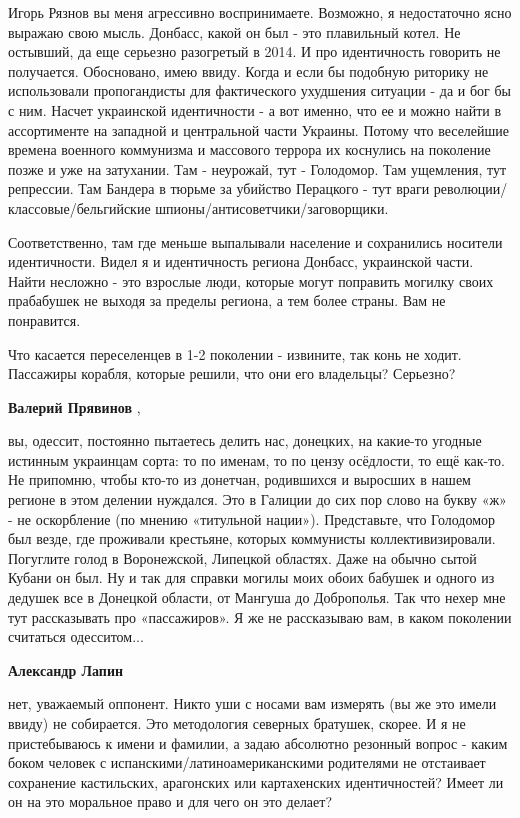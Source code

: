 \begin{itemize}
\begin{itemize}

Игорь Рязнов вы меня агрессивно воспринимаете. Возможно, я недостаточно ясно
выражаю свою мысль. Донбасс, какой он был - это плавильный котел. Не остывший,
да еще серьезно разогретый в 2014. И про идентичность говорить не получается.
Обосновано, имею ввиду. Когда и если бы подобную риторику не использовали
пропогандисты для фактического ухудшения ситуации - да и бог бы с ним. Насчет
украинской идентичности - а вот именно, что ее и можно найти в ассортименте на
западной и центральной части Украины. Потому что веселейшие времена военного
коммунизма и массового террора их коснулись на поколение позже и уже на
затухании. Там - неурожай, тут - Голодомор. Там ущемления, тут репрессии. Там
Бандера в тюрьме за убийство Перацкого - тут враги
революции/классовые/бельгийские шпионы/антисоветчики/заговорщики.

Соответственно, там где меньше выпалывали население и сохранились носители
идентичности. Видел я и идентичность региона Донбасс, украинской части. Найти
несложно - это взрослые люди, которые могут поправить могилку своих прабабушек
не выходя за пределы региона, а тем более страны. Вам не понравится.

Что касается переселенцев в 1-2 поколении - извините, так конь не ходит. Пассажиры корабля, которые решили, что они его владельцы? Серьезно?

\textbf{Валерий Прявинов} , 

вы, одессит, постоянно пытаетесь делить нас, донецких, на какие-то угодные
истинным украинцам сорта: то по именам, то по цензу осёдлости, то ещё как-то.
Не припомню, чтобы кто-то из донетчан, родившихся и выросших в нашем регионе в
этом делении нуждался. Это в Галиции до сих пор слово на букву «ж» - не
оскорбление (по мнению «титульной нации»). Представьте, что Голодомор был
везде, где проживали крестьяне, которых коммунисты коллективизировали.
Погуглите голод в Воронежской, Липецкой областях. Даже на обычно сытой Кубани
он был. Ну и так для справки могилы моих обоих бабушек и одного из дедушек все
в Донецкой области, от Мангуша до Доброполья. Так что нехер мне тут
рассказывать про «пассажиров». Я же не рассказываю вам, в каком поколении
считаться одесситом...

\textbf{Александр Лапин} 

нет, уважаемый оппонент. Никто уши с носами вам измерять (вы же это имели
ввиду) не собирается. Это методология северных братушек, скорее. И я не
пристебываюсь к имени и фамилии, а задаю абсолютно резонный вопрос - каким
боком человек с испанскими/латиноамериканскими родителями не отстаивает
сохранение кастильских, арагонских или картахенских идентичностей? Имеет ли он
на это моральное право и для чего он это делает?


\end{itemize}
\end{itemize}
